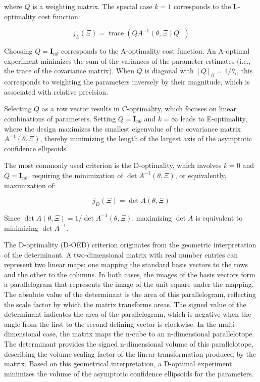 \documentclass[../Article_Design_of_Experiment.tex]{subfiles}
\begin{document}
	where $Q$ is a weighting matrix. The special case $k=1$ corresponds to the L-optimality cost function:
	
	{\footnotesize \begin{equation} j_L(\Xi) = \operatorname{trace} \left( Q A^{-1}(\theta, \Xi) Q^\top \right) \end{equation} }
	
	Choosing $Q = \mathbf{I}_{n\theta}$ corresponds to the A-optimality cost function. An A-optimal experiment minimizes the sum of the variances of the parameter estimates (i.e., the trace of the covariance matrix). When $Q$ is diagonal with $[Q]_{ii} = 1/\theta_i$, this corresponds to weighting the parameters inversely by their magnitude, which is associated with relative precision.
	
	Selecting $Q$ as a row vector results in C-optimality, which focuses on linear combinations of parameters. Setting $Q = \mathbf{I}_{n\theta}$ and $k = \infty$ leads to E-optimality, where the design maximizes the smallest eigenvalue of the covariance matrix $A^{-1}(\theta, \Xi)$, thereby minimizing the length of the largest axis of the asymptotic confidence ellipsoids.
	
	The most commonly used criterion is the D-optimality, which involves $k = 0$ and $Q = \mathbf{I}_{n\theta}$, requiring the minimization of $\det A^{-1}(\theta, \Xi)$, or equivalently, maximization of:
	
	{\footnotesize \begin{equation} j_D(\Xi) = \det A(\theta, \Xi) \end{equation} }
	
	Since $\det A(\theta, \Xi) = 1 / \det A^{-1}(\theta, \Xi)$, maximizing $\det A$ is equivalent to minimizing $\det A^{-1}$.
	
	The D-optimality (D-OED) criterion originates from the geometric interpretation of the determinant. A two-dimensional matrix with real number entries can represent two linear maps: one mapping the standard basis vectors to the rows and the other to the columns. In both cases, the images of the basis vectors form a parallelogram that represents the image of the unit square under the mapping. The absolute value of the determinant is the area of this parallelogram, reflecting the scale factor by which the matrix transforms areas. The signed value of the determinant indicates the area of the parallelogram, which is negative when the angle from the first to the second defining vector is clockwise. In the multi-dimensional case, the matrix maps the n-cube to an n-dimensional parallelotope. The determinant provides the signed n-dimensional volume of this parallelotope, describing the volume scaling factor of the linear transformation produced by the matrix. Based on this geometrical interpretation, a D-optimal experiment minimizes the volume of the asymptotic confidence ellipsoids for the parameters.
	
\end{document}
